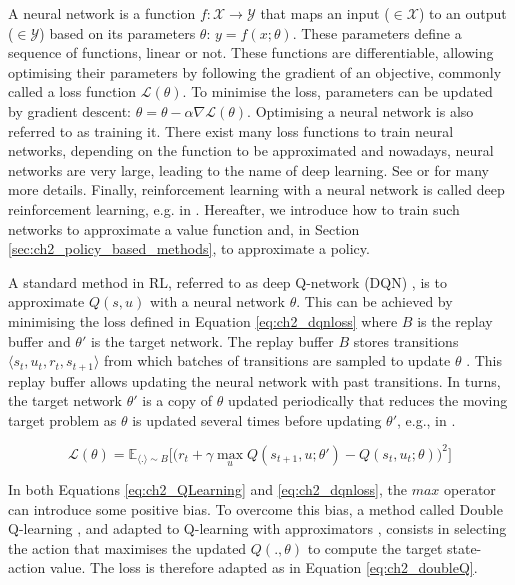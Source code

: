 A neural network is a function $f: \mathcal{X} \rightarrow \mathcal{Y}$ that maps an input ($\in\mathcal{X}$) to an output ($\in\mathcal{Y}$) based on its parameters $\theta$: $y = f(x;\theta)$.
These parameters define a sequence of functions, linear or not.
These functions are differentiable, allowing optimising their parameters by following the gradient of an objective, commonly called a loss function $\mathcal{L}(\theta)$.
To minimise the loss, parameters can be updated by gradient descent: $\theta = \theta - \alpha \nabla \mathcal{L}(\theta)$.
Optimising a neural network is also referred to as training it.
There exist many loss functions to train neural networks, depending on the function to be approximated and nowadays, neural networks are very large, leading to the name of deep learning.
See \citep{zhang2023dive} or \citep{pml1Book} for many more details.
Finally, reinforcement learning with a neural network is called deep reinforcement learning, e.g. in \citep{introDeepRL}.
Hereafter, we introduce how to train such networks to approximate a value function and, in Section \ref{sec:ch2_policy_based_methods}, to approximate a policy.

A standard method in RL, referred to as deep Q-network (DQN) \citep{Mnih2015}, is to approximate $Q(s, u)$ with a neural network $\theta$.
This can be achieved by minimising the loss defined in Equation \ref{eq:ch2_dqnloss} where $B$ is the replay buffer and $\theta'$ is the target network.
The replay buffer $B$ stores transitions $\langle s_{t},u_{t},r_{t},s_{t+1}\rangle$ from which batches of transitions are sampled to update $\theta$ \citep{lin1992self}.
This replay buffer allows updating the neural network with past transitions.
In turns, the target network $\theta'$ is a copy of $\theta$ updated periodically that reduces the moving target problem as $\theta$ is updated several times before updating $\theta'$, e.g., in \citep{Mnih2015}.

\begin{equation}
\label{eq:ch2_dqnloss}
    \mathcal{L}(\theta) = \mathbb{E}_{\langle . \rangle\sim B} \big[\big(r_{t} + \gamma \max_u Q(s_{t+1}, u; \theta')- Q(s_{t}, u_{t}; \theta)\big)^{2}\big]
\end{equation}

In both Equations \ref{eq:ch2_QLearning} and \ref{eq:ch2_dqnloss}, the $max$ operator can introduce some positive bias. 
To overcome this bias, a method called Double Q-learning \citep{hasselt2010double}, and adapted to Q-learning with approximators \citep{van2016deep}, consists in selecting the action that maximises the updated $Q(., \theta)$ to compute the target state-action value.
The loss is therefore adapted as in Equation \ref{eq:ch2_doubleQ}.

